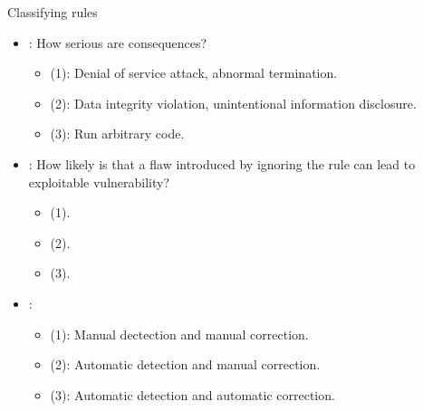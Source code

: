 \begin{frame}[t]{Classifying rules}
\begin{itemize}
  \item {}: How serious are consequences?
    \begin{itemize}
      \item {} (1): Denial of service attack, abnormal termination.
      \item {} (2): Data integrity violation, unintentional information disclosure.
      \item {} (3): Run arbitrary code.
    \end{itemize}

  \vfill\pause
  \item {}: How likely is that a flaw introduced by ignoring the rule
        can lead to exploitable vulnerability?
    \begin{itemize}
      \item {} (1).
      \item {} (2).
      \item {} (3).
    \end{itemize}

  \vfill\pause
  \item {}:
    \begin{itemize}
      \item {} (1): Manual dectection and manual correction.
      \item {} (2): Automatic detection and manual correction.
      \item {} (3): Automatic detection and automatic correction.
    \end{itemize} 
\end{itemize}
\end{frame}

